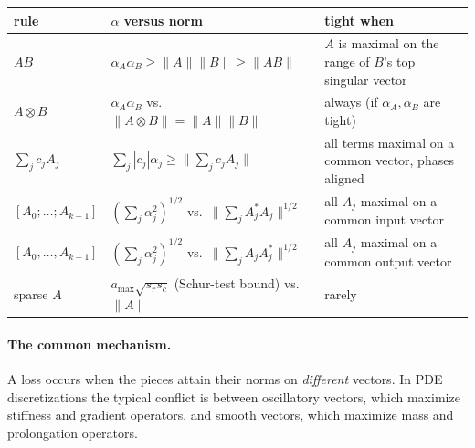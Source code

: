 \documentclass[11pt,a4paper]{article}
\begin{document}
\begin{center}\small
\begin{tabular}{@{}lp{5.4cm}p{5.6cm}@{}}
\toprule
rule & $\alpha$ versus norm & tight when \\
\midrule
$AB$ & $\alpha_A\alpha_B\ge\|A\|\|B\|\ge\|AB\|$ & $A$ is maximal on the range of $B$'s top singular vector\\
$A\otimes B$ & $\alpha_A\alpha_B$ vs.\ $\|A\otimes B\|=\|A\|\|B\|$ & always (if $\alpha_A,\alpha_B$ are tight)\\
$\sum_jc_jA_j$ & $\sum_j|c_j|\alpha_j\ge\|\sum_jc_jA_j\|$ & all terms maximal on a common vector, phases aligned\\
$[A_0;\dots;A_{k-1}]$ & $(\sum_j\alpha_j^2)^{1/2}$ vs.\ $\|\sum_jA_j^*A_j\|^{1/2}$ & all $A_j$ maximal on a common input vector\\
$[A_0,\dots,A_{k-1}]$ & $(\sum_j\alpha_j^2)^{1/2}$ vs.\ $\|\sum_jA_jA_j^*\|^{1/2}$ & all $A_j$ maximal on a common output vector\\
sparse $A$ & $a_{\max}\sqrt{s_rs_c}$ (Schur-test bound) vs.\ $\|A\|$ & rarely\\
\bottomrule
\end{tabular}
\end{center}

\paragraph{The common mechanism.} A loss occurs when the pieces attain
their norms on \emph{different} vectors. In PDE discretizations the typical
conflict is between oscillatory vectors, which maximize stiffness and
gradient operators, and smooth vectors, which maximize mass and
prolongation operators.
\end{document}
